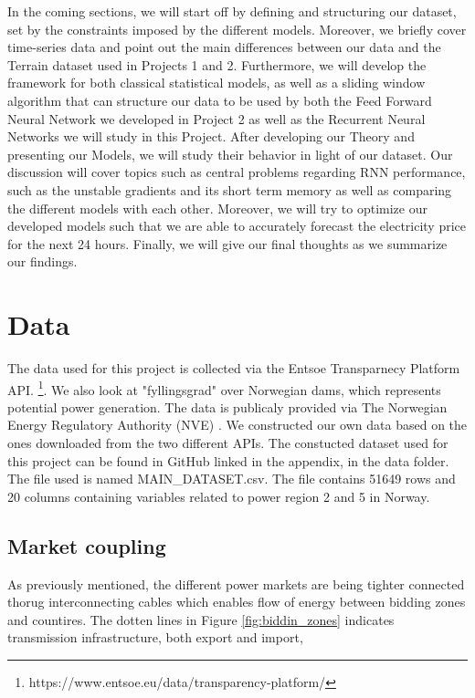 \documentclass
[twocolumn,
secnumarabic,
nobibnotes,
aps,
prl,
reprint,
groupedaddress,
amsmath,
amssymb,
]{revtex4-2}
\begin{document}
In the coming sections, we will start off by defining and structuring our dataset, set by the constraints imposed by the different models. Moreover, we briefly cover time-series data and point out the main differences between our data and the Terrain dataset used in Projects 1 and 2. Furthermore, we will develop the framework for both classical statistical models, as well as a sliding window algorithm that can structure our data to be used by both the Feed Forward Neural Network we developed in Project 2 as well as the Recurrent Neural Networks we will study in this Project. After developing our Theory and presenting our Models, we will study their behavior in light of our dataset. Our discussion will cover topics such as central problems regarding RNN performance, such as the unstable gradients and its short term memory as well as comparing the different models with each other. Moreover, we will try to optimize our developed models such that we are able to accurately forecast the electricity price for the next 24 hours. Finally, we will give our final thoughts as we summarize our findings.

\section{Data}
The data used for this project is collected via the Entsoe Transparnecy Platform API. \footnote{https://www.entsoe.eu/data/transparency-platform/}. We also look at "fyllingsgrad" over Norwegian dams, which represents potential power generation. The data is publicaly provided via The Norwegian Energy Regulatory Authority (NVE) \cite{noauthor_magasinstatistikk_nodate}. 
We constructed our own data based on the ones downloaded from the two different APIs. The constucted dataset used for this project can be found in GitHub linked in the appendix, in the data folder. The file used is named MAIN\_DATASET.csv. The file contains 51649 rows and 20 columns containing variables related to power region 2 and 5 in Norway.


\subsection{Market coupling}
As previously mentioned, the different power markets are being tighter connected thorug interconnecting cables which enables flow of energy between bidding zones and countires. The dotten lines in Figure \ref{fig:biddin_zones} indicates transmission infrastructure, both export and import, 
\end{document}
